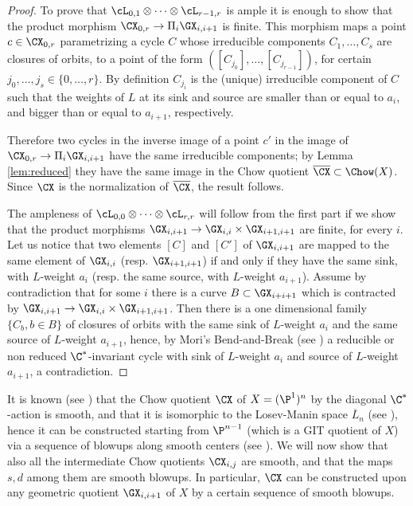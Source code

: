 \documentclass[reqno]{amsproc}
\theoremstyle{definition}
\begin{document}
\begin{proof} 
To prove that $\cL_{0,1}\otimes\cdots\otimes\cL_{r-1,r}$ is ample
it is enough to show that the product morphism $\CX_{0,r} \to \Pi_i \GX_{i,i+1}$ is finite. This morphism maps a point $c \in \CX_{0,r}$ parametrizing a cycle
$C$ whose irreducible components  $C_1, \dots, C_s$ are closures of orbits, to a point of the form $([C_{j_0}], \dots, [C_{j_{r-1}}])$, for certain $j_0,\dots,j_s\in \{0,\dots,r\}$.
By definition $C_{j_i}$ is the (unique) irreducible component of $C$ such that the weights of $L$ at its sink and source are smaller than or equal to $a_i$, and bigger than or equal to $ a_{i+1}$, respectively. 


Therefore two cycles in the inverse image of a point $c'$ in the image of $\CX_{0,r} \to \Pi_i \GX_{i,i+1}$ have the same irreducible components; by Lemma \ref{lem:reduced} they have the same image in the Chow quotient $\overline{\CX}\subset\Chow(X)$. Since $\CX$ is the normalization of $\overline{\CX}$,  the result follows.

The ampleness of $ \cL_{0,0}\otimes\cdots\otimes\cL_{r,r}$ will follow from the first part if we show that
 the product morphisms $\GX_{i,i+1}\rightarrow\GX_{i,i}\times\GX_{i+1,i+1}$ are finite, for every $i$. Let us notice that two elements $[C]$ and $[C']$ of $\GX_{i,i+1}$ are mapped to the same element of $\GX_{i,i}$ (resp. $\GX_{i+1,i+1}$) if and only if they have the same sink, with $L$-weight $a_i$ (resp.  the same source, with $L$-weight $a_{i+1}$).
Assume by contradiction that for some $i$ there is a curve $B\subset\GX_{i+i+1}$ which is contracted by $\GX_{i,i+1}\rightarrow\GX_{i,i}\times\GX_{i+1,i+1}$. Then there is a one dimensional family $\{C_b, b \in B\}$ of closures of orbits with the same sink of $L$-weight $a_i$ and the same source of  $L$-weight $a_{i+1}$, hence,  by Mori's Bend-and-Break (see \cite[Proposition 3.2]{De}) a reducible or non reduced $\C^*$-invariant cycle with sink of $L$-weight $a_i$ and source of  $L$-weight $a_{i+1}$, a contradiction.
\end{proof}

It is known (see \cite[1.1]{DRS}) that the Chow quotient $\CX$ of $X=(\P^1)^n$ by the diagonal $\C^*$-action is smooth, and that it is isomorphic to the Losev-Manin space $\overline{L}_n$ (see \cite{LS}), hence it can be constructed starting from $\P^{n-1}$ (which is a GIT quotient of $X$) via a sequence of blowups along smooth centers (see \cite[6.1]{Hassett}). We will now show that also all the intermediate Chow quotients $\CX_{i,j}$ are smooth, and that the maps $s,d$ among them are smooth blowups. In particular, $\CX$ can be constructed upon any geometric quotient $\GX_{i,i+1}$ of $X$ by a certain sequence of smooth blowups.
\end{document}
